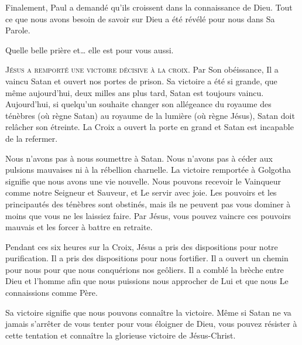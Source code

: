 Finalement, Paul a demandé qu'ils croissent dans la connaissance de Dieu.
 Tout ce que nous avons besoin de savoir sur Dieu a été révélé
 pour nous dans Sa Parole.

Quelle belle prière et\dots{} elle est pour vous aussi.

\dvrule






\lettrine{J}{ésus a remporté une victoire décisive à la croix.}
 Par Son obéissance, Il a vaincu Satan et ouvert nos portes de prison.
 Sa victoire a été si grande, que même aujourd'hui, deux milles ans plus tard,
 Satan est toujours vaincu. Aujourd'hui, si quelqu'un souhaite changer
 son allégeance du royaume des ténèbres (où règne Satan)
 au royaume de la lumière (où règne Jésus), Satan doit relâcher son étreinte.
 La Croix  a ouvert la porte en grand
 \ocadr et Satan est incapable de la refermer.


Nous n'avons pas à nous soumettre à Satan. Nous n'avons pas à céder
 aux pulsions mauvaises ni à la rébellion charnelle.
 La victoire remportée à Golgotha  signifie que
 nous avons une vie nouvelle. Nous pouvons recevoir le Vainqueur
 comme notre Seigneur et Sauveur, et Le servir avec joie.
 Les pouvoirs et les principautés des ténèbres sont obstinés,
 mais ils ne peuvent pas vous dominer à moins que vous ne les laissiez faire.
 Par Jésus, vous pouvez vaincre ces pouvoirs mauvais et les forcer
 à battre en retraite.

Pendant ces six heures sur la Croix, Jésus a pris des dispositions
 pour notre purification. Il a pris des dispositions pour nous fortifier.
 Il a ouvert un chemin pour nous pour que nous conquérions nos geôliers.
 Il a comblé la brèche entre Dieu et l'homme afin que nous puissions
 nous approcher de Lui et que nous Le connaissions comme Père.

Sa victoire signifie que nous pouvons connaître la victoire.
 Même si Satan ne va jamais s'arrêter de vous tenter pour vous éloigner
 de Dieu, vous pouvez résister à cette tentation et connaître
 la glorieuse victoire de Jésus-Christ. 

